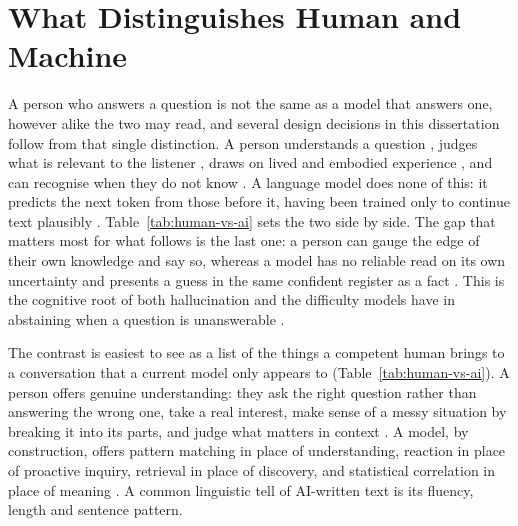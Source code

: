 \break

\section{What Distinguishes Human and Machine}
\label{sec:human-vs-ai}

A person who answers a question is not the same as a model that answers one, however alike the two may read, and several design decisions in this dissertation follow from that single distinction. A person understands a question \cite{tomasello2008origins}, judges what is relevant to the listener \cite{clark1996usinglanguage, sperberwilson1995relevance}, draws on lived and embodied experience \cite{barsalou2008grounded, bruner1990acts}, and can recognise when they do not know \cite{flavell1979metacognition}. A language model does none of this: it predicts the next token from those before it, having been trained only to continue text plausibly \cite{vaswani2023attentionneed, brown2020languagemodelsfewshotlearners}. Table~\ref{tab:human-vs-ai} sets the two side by side. The gap that matters most for what follows is the last one: a person can gauge the edge of their own knowledge and say so, whereas a model has no reliable read on its own uncertainty and presents a guess in the same confident register as a fact \cite{bender2021stochasticparrots}. This is the cognitive root of both hallucination \cite{ji2024surveyhallucinationnaturallanguage} and the difficulty models have in abstaining when a question is unanswerable \cite{wen2025knowlimitssurveyabstention, kirichenko2025abstentionbenchreasoningllmsfail}.

The contrast is easiest to see as a list of the things a competent human brings to a conversation that a current model only appears to (Table~\ref{tab:human-vs-ai}). A person offers genuine understanding: they ask the right question rather than answering the wrong one, take a real interest, make sense of a messy situation by breaking it into its parts, and judge what matters in context \cite{tomasello2008origins, clark1996usinglanguage}. A model, by construction, offers pattern matching in place of understanding, reaction in place of proactive inquiry, retrieval in place of discovery, and statistical correlation in place of meaning \cite{bender2021stochasticparrots}. A common linguistic tell of AI-written text is its fluency, length and sentence pattern.

